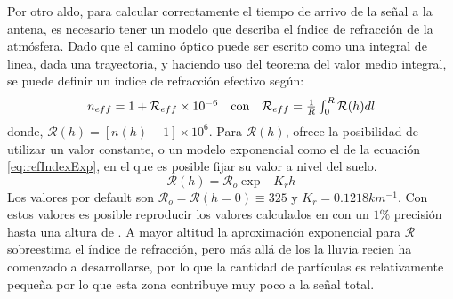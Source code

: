		
		Por otro aldo, para calcular correctamente el tiempo de arrivo de la se\~nal a la antena, es necesario tener un modelo que describa el \'indice de refracci\'on de la atm\'osfera.
		Dado que el camino \'optico puede ser escrito como una integral de linea, dada una trayectoria, y haciendo uso del teorema del valor medio integral, se puede definir un \'indice de refracci\'on efectivo seg\'un:
		\begin{equation}
			\begin{matrix}
			n_{eff}
			=
			1+{\mathcal R}_{eff}\times10^{-6}
			&
			{\rm con}
			&
			{\mathcal R}_{eff}
			=
			\frac{1}{R}\int_0^R{\mathcal R}(h)dl
			\end{matrix}
		\label{eq:refIndexEff}
		\end{equation}
		donde, ${\mathcal R}(h) = \left[ n(h)-1 \right] \times 10^6$.
		Para ${\mathcal R}(h)$, \zhs{} ofrece la posibilidad de utilizar un valor constante, o un modelo exponencial como el de la ecuaci\'on \ref{eq:refIndexExp}, en el que es posible fijar su valor a nivel del suelo.
		\begin{equation}
		{\mathcal R}(h)
		=
		{\mathcal R}_o
		\exp{-K_rh}
		\label{eq:refIndexExp}
		\end{equation}
		Los valores por default son ${\mathcal R}_o={\mathcal R}(h=0)\equiv 325$ y $K_r=0.1218km^{-1}$.
		Con estos valores es posible reproducir los valores calculados en \cite{gerson1948polar} con un $1\%$ precisi\'on hasta una altura de .
		A mayor altitud la aproximaci\'on exponencial para ${\mathcal R}$ sobreestima el \'indice de refracci\'on, pero m\'as all\'a de los  la lluvia recien ha comenzado a desarrollarse, por lo que la cantidad de part\'iculas es relativamente peque\~na por lo que esta zona contribuye muy poco a la se\~nal total.
		
